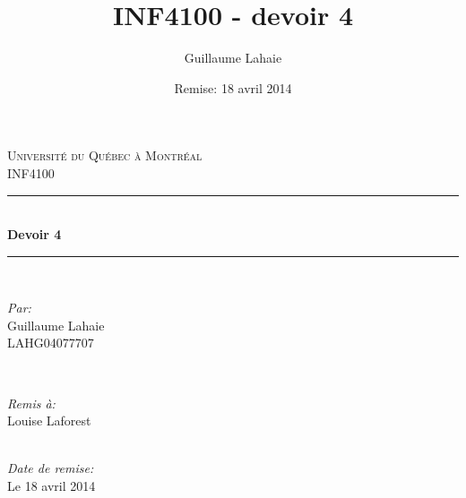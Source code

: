 \documentclass[10.9pt]{article} %
\title{INF4100 - devoir 4}
\author{Guillaume Lahaie}
\date{Remise: 18 avril 2014}
\newcommand\blankpage{%
  \null
  \thispagestyle{empty}%
  \addtocounter{page}{-1}%
  \newpage}
\begin{document}
\fussy


\begin{titlepage}

\newcommand{\HRule}{\rule{\linewidth}{0.5mm}} %

\center %

\textsc{\LARGE Université du Québec à Montréal}\\[1.5cm] %
\textsc{\Large INF4100}\\[0.5cm] %

\HRule \\[1.5cm]
{ \huge \bfseries Devoir 4}\\[0.4cm] %
\HRule \\[1.5cm]

\begin{minipage}{0.4\textwidth}
\begin{flushleft} \large
\emph{Par:}\\
Guillaume Lahaie \\ LAHG04077707 %
\end{flushleft}
\end{minipage}
~
\begin{minipage}{0.4\textwidth}
\begin{flushright} \large
\emph{Remis à:} \\
Louise Laforest %
\end{flushright}
\end{minipage}\\[4cm]

{\large \emph{Date de remise:} \\ Le 18 avril 2014}\\[3cm] %


\vfill %

\end{titlepage}
\blankpage
\end{document}
